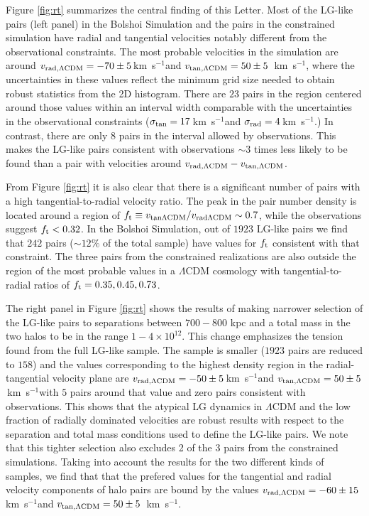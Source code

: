 \documentclass{emulateapj}
\newcommand{\kms}{\,km~s$^{-1}$}
\newcommand{\Msun}{{\ifmmode{{\rm {M_{\odot}}}}\else{${\rm{M_{\odot}}}$}\fi}}
\begin{document}
Figure \ref{fig:rt} summarizes the central finding of this Letter. Most of the LG-like pairs (left panel) in the Bolshoi Simulation and the pairs in the constrained simulation have radial and tangential velocities notably different from the observational constraints.  The most probable velocities in the simulation are around $v_{\rm rad,\Lambda CDM} = -70\pm5$\kms and $v_{\rm tan,\Lambda CDM} = 50\pm5$ \kms, where the uncertainties in these values reflect the minimum grid size needed to obtain robust statistics from the 2D histogram. There are $23$ pairs in the region centered around those values within an interval width comparable with the uncertainties in the observational constraints ($\sigma_{\rm tan}=17$\kms and $\sigma_{\rm rad}=4$\kms.) In contrast, there are only $8$ pairs in the interval allowed by observations. This makes the LG-like pairs consistent with observations $\sim3$ times less likely to be found than a pair with velocities around $v_{\rm rad,\Lambda CDM}-v_{\rm tan,\Lambda CDM}$.

From Figure \ref{fig:rt} it is also clear that there is a significant number of pairs with a high tangential-to-radial velocity ratio. The peak in the pair number density is located around a region of $f_{\rm t}\equiv v_{\rm tan \Lambda CDM}/v_{\rm rad \Lambda CDM}\sim 0.7$, while the observations suggest $f_{\rm t}<0.32$. In the Bolshoi Simulation, out of $1923$ LG-like pairs we find that $242$ pairs ($\sim 12\%$ of the total sample) have values for $f_{\rm t}$ consistent with that constraint. The three pairs from the constrained realizations are also outside the region of the most probable values in a $\Lambda$CDM cosmology with tangential-to-radial ratios of $f_{\rm t}= 0.35, 0.45, 0.73$.

The right panel in Figure \ref{fig:rt} shows the results of making narrower selection of the LG-like pairs to separations between $700-800$ kpc and a total mass in the two halos to be in the range $1-4 \times 10^{12}$\Msun. This change emphasizes the tension found from the full LG-like sample. The sample is smaller ($1923$ pairs are reduced to $158$) and the values corresponding to the highest density region in the radial-tangential velocity plane are  $v_{\rm rad,\Lambda CDM} = -50\pm5$\kms and $v_{\rm tan,\Lambda CDM} = 50\pm5$\kms with $5$ pairs around that value and zero pairs consistent with observations. This shows that the atypical LG dynamics in $\Lambda$CDM and the low fraction of radially dominated velocities are robust results with respect to the separation and total mass conditions used to define the LG-like pairs.  We note that this tighter selection also excludes 2 of the 3 pairs from the constrained simulations. Taking into account the results for the two different kinds of samples, we find that that the prefered values for the tangential and radial velocity components of halo pairs are bound by the values  $v_{\rm rad,\Lambda CDM} = -60\pm 15$\kms and $v_{\rm tan,\Lambda CDM} = 50\pm5$ \kms. 
\end{document}
